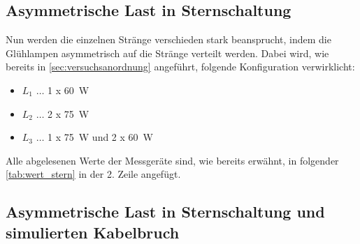 \documentclass[12pt,english,ngerman]{scrartcl}
\begin{document}
\begin{table}[H]
	\caption[Abgelesene Werte bei Sternschaltung] {Abgelesene Werte bei Sternschaltung                                        \\
		1. Zeile \dots symmetrische Belastung                                      \\
		2. Zeile \dots asymmetrische Belastung                                     \\
		3. Zeile \dots asymmetrische Belastung mit simulierten Kabelbruch          \\
		$I_i \dots$ gemessener Strom am i-ten Strang in A                          \\
		$I_{31} \dots$ gemessener Strom zwischen Sternpunkt und Neutralleiter in A \\
		$U_{i} \dots$ gemessene Spannung am i-ten Strang in V                      \\
		$P_{i}^M \dots$ gemessene Wirkleistungen in W (für genaue Bezeichnung siehe \autoref{fig:aufbau2})
	}\label{tab:wert_stern}
	\centering
	
	
\end{table}

\subsection{Asymmetrische Last in Sternschaltung}\label{sec:vers_asy_stern_ohne}

Nun werden die einzelnen Stränge verschieden stark beansprucht, indem die
Glühlampen asymmetrisch auf die Stränge verteilt werden. Dabei wird, wie
bereits in \autoref{sec:versuchsanordnung} angeführt, folgende Konfiguration
verwirklicht:

\begin{itemize}
	\item $L_1$ \(\dots\) 1 x \SI[]{60}{\watt}
	\item $L_2$ \(\dots\) 2 x \SI[]{75}{\watt}
	\item $L_3$ \(\dots\) 1 x \SI[]{75}{\watt} und 2 x \SI[]{60}{\watt}
\end{itemize}

Alle abgelesenen Werte der Messgeräte sind, wie bereits erwähnt, in folgender
\autoref{tab:wert_stern} in der 2. Zeile angefügt.

\subsection{Asymmetrische Last in Sternschaltung und simulierten Kabelbruch}\label{sec:vers_asy_stern_mit}
\end{document}
